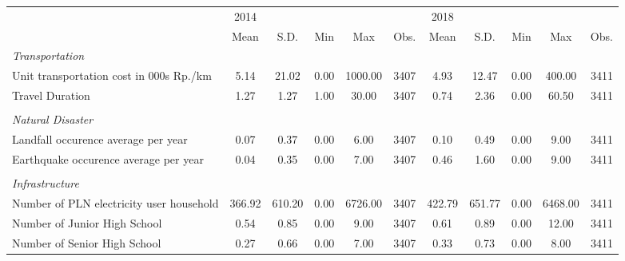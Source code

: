 \begin{tabular}{l*{2}{ccccc}}
\toprule
                &     2014&         &         &         &         &     2018&         &         &         &         \\
                &     Mean&     S.D.&      Min&      Max&     Obs.&     Mean&     S.D.&      Min&      Max&     Obs.\\
\midrule
\emph{Transportation}&         &         &         &         &         &         &         &         &         &         \\
\hspace{0.25cm} Unit transportation cost in 000s Rp./km&     5.14&    21.02&     0.00&  1000.00&     3407&     4.93&    12.47&     0.00&   400.00&     3411\\
\hspace{0.25cm} Travel Duration&     1.27&     1.27&     1.00&    30.00&     3407&     0.74&     2.36&     0.00&    60.50&     3411\\
\vspace{0.05em} \\ \emph{Natural Disaster}&         &         &         &         &         &         &         &         &         &         \\
\hspace{0.25cm} Landfall occurence average per year&     0.07&     0.37&     0.00&     6.00&     3407&     0.10&     0.49&     0.00&     9.00&     3411\\
\hspace{0.25cm} Earthquake occurence average per year&     0.04&     0.35&     0.00&     7.00&     3407&     0.46&     1.60&     0.00&     9.00&     3411\\
\vspace{0.05em} \\ \emph{Infrastructure}&         &         &         &         &         &         &         &         &         &         \\
\hspace{0.25cm} Number of PLN electricity user household&   366.92&   610.20&     0.00&  6726.00&     3407&   422.79&   651.77&     0.00&  6468.00&     3411\\
\hspace{0.25cm} Number of Junior High School&     0.54&     0.85&     0.00&     9.00&     3407&     0.61&     0.89&     0.00&    12.00&     3411\\
\hspace{0.25cm} Number of Senior High School&     0.27&     0.66&     0.00&     7.00&     3407&     0.33&     0.73&     0.00&     8.00&     3411\\

\end{tabular}
